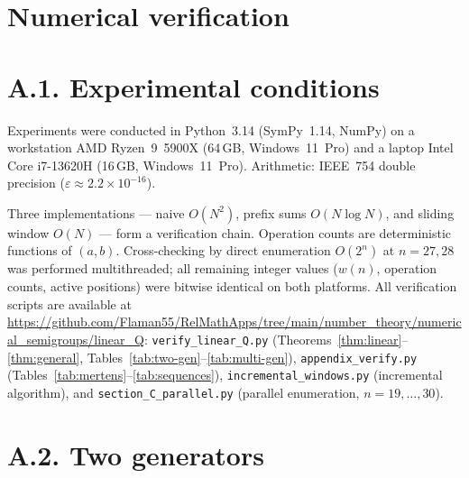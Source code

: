\appendix
\section{Numerical verification}
\label{sec:verification}

\section*{A.1. Experimental conditions}
\label{subsec:a1-conditions}

Experiments were conducted in Python~3.14 (SymPy~1.14, NumPy)
on a workstation AMD Ryzen~9~5900X (64\,GB, Windows~11~Pro)
and a laptop Intel Core i7-13620H (16\,GB, Windows~11~Pro).
Arithmetic: IEEE~754 double precision ($\varepsilon \approx 2{.}2 \times 10^{-16}$).

Three implementations --- naive $O(N^2)$, prefix sums $O(N\log N)$,
and sliding window $O(N)$ --- form a verification chain.
Operation counts are deterministic functions of $(a, b)$.
Cross-checking by direct enumeration $O(2^n)$
at $n = 27, 28$ was performed multithreaded;
all remaining integer values
($w(n)$, operation counts, active positions)
were bitwise identical on both platforms.
All verification scripts are available at
\url{https://github.com/Flaman55/RelMathApps/tree/main/number_theory/numerical_semigroups/linear_Q}:
\texttt{verify\_linear\_Q.py} (Theorems~\ref{thm:linear}--\ref{thm:general},
Tables~\ref{tab:two-gen}--\ref{tab:multi-gen}),
\texttt{appendix\_verify.py} (Tables~\ref{tab:mertens}--\ref{tab:sequences}),
\texttt{incremental\_windows.py} (incremental algorithm),
and \texttt{section\_C\_parallel.py} (parallel enumeration, $n=19,\ldots,30$).

\section*{A.2. Two generators}
\label{subsec:a2-two}

